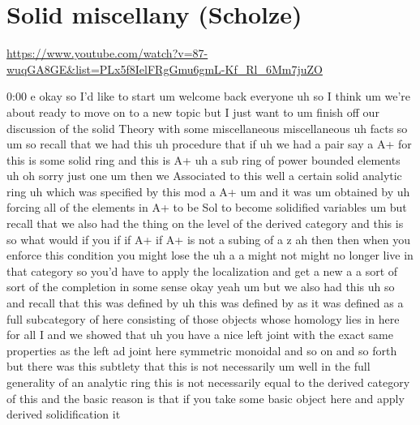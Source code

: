 
\section{\ufs Solid miscellany (Scholze)}

\url{https://www.youtube.com/watch?v=87-wuqGA8GE&list=PLx5f8IelFRgGmu6gmL-Kf_Rl_6Mm7juZO}
\renewcommand{\yt}[2]{\href{https://www.youtube.com/watch?v=87-wuqGA8GE&list=PLx5f8IelFRgGmu6gmL-Kf_Rl_6Mm7juZO&t=#1}{#2}}
\vspace{1em}

\begin{unfinished}{0:00}
e
okay  so  I'd  like  to  start  um  welcome
back  everyone  uh  so  I  think  um  we're
about  ready  to  move  on  to  a  new  topic
but  I  just  want  to  um  finish  off  our
discussion  of  the  solid  Theory  with  some
miscellaneous
miscellaneous  uh  facts
so
um  so
recall  that  we  had  this  uh  procedure
that  if  uh  we  had  a  pair  say  a  A+  for
this  is  some  solid
ring  and  this  is  A+  uh  a  sub
ring  of  power  bounded
elements  uh  oh  sorry  just  one
um  then  we  Associated  to  this  well  a
certain  solid  analytic  ring  uh  which
was  specified  by  this  mod  a
A+
um  and  it  was  um  obtained  by  uh  forcing
all  of  the  elements  in  A+  to  be  Sol  to
become  solidified
variables  um  but  recall  that  we  also  had
the  thing  on  the  level  of  the  derived
category  and  this  is  so  what  would  if
you  if  if
A+  if  A+  is  not  a  subing  of  a  z  ah  then
then  when  you  enforce  this  condition  you
might  lose  the  uh  a  a  might  not  might  no
longer  live  in  that
category  so  you'd  have  to  apply  the
localization  and  get  a  new  a  a  sort  of
sort  of  the  completion  in  some  sense
okay
yeah  um  but  we  also  had  this
uh
so  and  recall  that  this  was  defined  by
uh  this  was  defined  by  as  it  was  defined
as  a  full  subcategory  of  here  consisting
of  those  objects  whose  homology  lies  in
here  for  all  I  and  we  showed  that  uh  you
have  a  nice  left  joint  with  the  exact
same  properties  as  the  left  ad  joint
here  symmetric  monoidal  and  so  on  and  so
forth  but  there  was  this  subtlety  that
this  is  not  necessarily  um  well  in  the
full  generality  of  an  analytic  ring  this
is  not  necessarily  equal  to  the  derived
category  of  this  and  the  basic  reason  is
that  if  you  take  some  basic  object  here
and  apply  derived  solidification  it

\end{unfinished}
